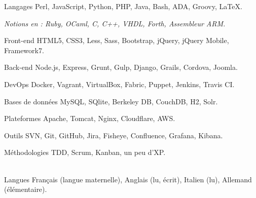 
\begin{cvskills}

  \cvskill
    {Langages}
    {Perl, JavaScript, Python, PHP, Java, Bash, ADA, Groovy, LaTeX.}

  \cvskill
    {}
    {\textit{Notions en : Ruby, OCaml, C, C++, VHDL, Forth, Assembleur ARM.}}

  \cvskill
    {Front-end}
    {HTML5, CSS3, Less, Sass, Bootstrap, jQuery, jQuery Mobile, Framework7.}

  \cvskill
    {Back-end}
    {Node.js, Express, Grunt, Gulp, Django, Grails, Cordova, Joomla.}

  \cvskill
    {DevOps}
    {Docker, Vagrant, VirtualBox, Fabric, Puppet, Jenkins, Travis CI.}

  \cvskill
    {Bases de données}
    {MySQL, SQlite, Berkeley DB, CouchDB, H2, Solr.}

  \cvskill
    {Plateformes}
    {Apache, Tomcat, Nginx, Cloudflare, AWS.}

  \cvskill
    {Outils}
    {SVN, Git, GitHub, Jira, Fisheye, Confluence, Grafana, Kibana.}

  \cvskill
    {Méthodologies}
    {TDD, Scrum, Kanban, un peu d'XP.}

  \\
  \cvskill
    {Langues}
    {Français (langue maternelle), Anglais (lu, écrit), Italien (lu), Allemand (élémentaire).}

\end{cvskills}
